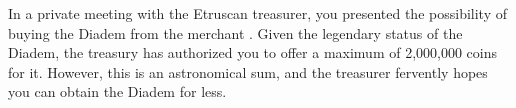 \documentclass[green]{Kos}
\begin{document}
\name{\gScythiaHaggling{}}

In a private meeting with the Etruscan treasurer, you presented the possibility of buying the Diadem from the merchant \cMerchant{\nickname}. Given the legendary status of the Diadem, the treasury has authorized you to offer a maximum of 2,000,000 coins for it. However, this is an astronomical sum, and the treasurer fervently hopes you can obtain the Diadem for less.
\end{document}
